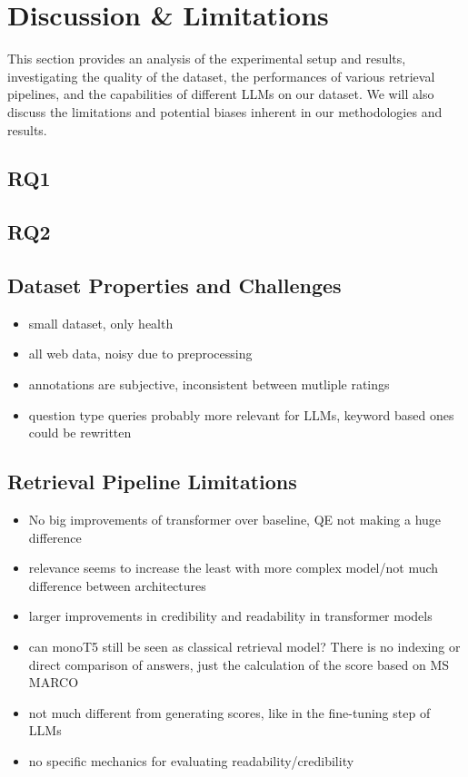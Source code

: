 \chapter{Discussion \& Limitations}

This section provides an analysis of the experimental setup and results, investigating the quality of the dataset, the performances of various retrieval pipelines, and the capabilities of different LLMs on our dataset.
We will also discuss the limitations and potential biases inherent in our methodologies and results.

\section{RQ1}

\section{RQ2}

\section{Dataset Properties and Challenges}
\begin{itemize}
    \item small dataset, only health
    \item all web data, noisy due to preprocessing
    \item annotations are subjective, inconsistent between mutliple ratings
    \item question type queries probably more relevant for LLMs, keyword based ones could be rewritten
\end{itemize}

\section{Retrieval Pipeline Limitations}
\begin{itemize}
    \item No big improvements of transformer over baseline, QE not making a huge difference
    \item relevance seems to increase the least with more complex model/not much difference between architectures
    \item larger improvements in credibility and readability in transformer models
    \item can monoT5 still be seen as classical retrieval model? There is no indexing or direct comparison of answers, just the calculation of the score based on MS MARCO
    \item not much different from generating scores, like in the fine-tuning step of LLMs
    \item no specific mechanics for evaluating readability/credibility
\end{itemize}


